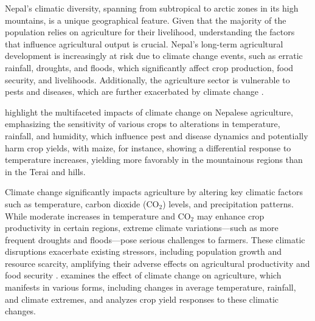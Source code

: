 Nepal’s climatic diversity, spanning from subtropical to arctic zones in its high mountains, is a unique geographical feature. Given that the majority of the population relies on agriculture for their livelihood, understanding the factors that influence agricultural output is crucial. Nepal's long-term agricultural development is increasingly at risk due to climate change events, such as erratic rainfall, droughts, and floods, which significantly affect crop production, food security, and livelihoods. Additionally, the agriculture sector is vulnerable to pests and diseases, which are further exacerbated by climate change \citep{gyawaliOverviewAgricultureNepal2021}.

\citet{mallaClimateChangeIts2009} highlight the multifaceted impacts of climate change on Nepalese agriculture, emphasizing the sensitivity of various crops to alterations in temperature, rainfall, and humidity, which influence pest and disease dynamics and potentially harm crop yields, with maize, for instance, showing a differential response to temperature increases, yielding more favorably in the mountainous regions than in the Terai and hills.
 
Climate change significantly impacts agriculture by altering key climatic factors such as temperature, carbon dioxide (CO$_2$) levels, and precipitation patterns. While moderate increases in temperature and CO$_2$ may enhance crop productivity in certain regions, extreme climate variations—such as more frequent droughts and floods—pose serious challenges to farmers. These climatic disruptions exacerbate existing stressors, including population growth and resource scarcity, amplifying their adverse effects on agricultural productivity and food security \citep{global_paudel_2015}. \citet{regmiCROPYIELDRESPONSE2019} examines the effect of climate change on agriculture, which manifests in various forms, including changes in average temperature, rainfall, and climate extremes, and analyzes crop yield responses to these climatic changes.

